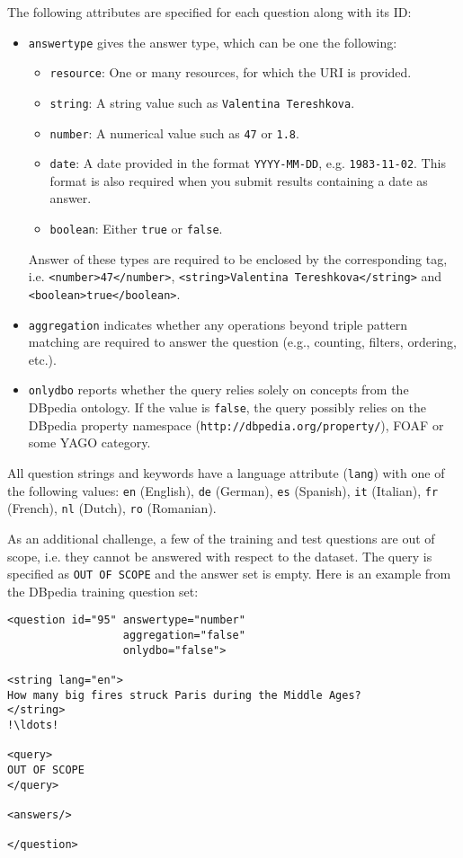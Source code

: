 The following attributes are specified for each question along with its ID:
\begin{itemize}
\item {\tt answertype} gives the answer type, which can be one the following:
\begin{itemize}
\item {\tt resource}: One or many resources, for which the URI is provided.
\item {\tt string}: A string value such as {\tt Valentina Tereshkova}.
\item {\tt number}: A numerical value such as {\tt 47} or {\tt 1.8}.
\item {\tt date}: A date provided in the format {\tt YYYY-MM-DD}, e.g. {\tt 1983-11-02}. 
This format is also required when you submit results containing a date as answer.
\item {\tt boolean}: Either {\tt true} or {\tt false}.
\end{itemize}
Answer of these types are required to be enclosed by the corresponding tag, i.e. {\tt <number>47</number>}, 
{\tt <string>Valentina Tereshkova</string>} 
and {\tt <boolean>true</boolean>}.
\item {\tt aggregation} indicates whether any operations beyond triple pattern matching are required to answer the question (e.g., counting, filters, ordering, etc.).
\item {\tt onlydbo} reports whether the query relies solely on concepts from the DBpedia ontology. If the value is {\tt false}, the query possibly relies 
on the DBpedia property namespace (\texttt{http://dbpedia.org/property/}), FOAF or some YAGO category. 
\end{itemize}

All question strings and keywords have a language attribute (\texttt{lang}) with one of the following values: 
\texttt{en} (English), \texttt{de} (German), \texttt{es} (Spanish), \texttt{it} (Italian), \texttt{fr} (French), \texttt{nl} (Dutch), \texttt{ro} (Romanian).

As an additional challenge, a few of the training and test questions are out of scope, i.e. they cannot be answered with respect to the dataset. 
The query is specified as {\tt OUT OF SCOPE} and the answer set is empty. Here is an example from the DBpedia training question set:

\begin{lstlisting}[escapechar=!]
<question id="95" answertype="number" 
                  aggregation="false" 
                  onlydbo="false">

<string lang="en">
How many big fires struck Paris during the Middle Ages?
</string>
!\ldots!

<query>
OUT OF SCOPE
</query>

<answers/>

</question>
\end{lstlisting}

